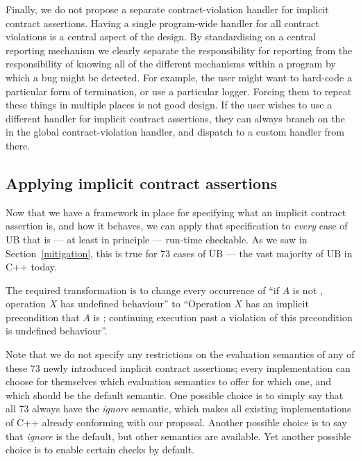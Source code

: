 Finally, we do not propose a separate contract-violation handler for implicit contract assertions. Having a single program-wide handler for all contract violations is a central aspect of the \cite{P2900R14} design. By standardising on a central reporting mechanism we clearly separate the responsibility for reporting from the responsibility of knowing all of the different mechanisms within a program by which a bug might be detected. For example, the user might want to hard-code a particular form of termination, or use a particular logger. Forcing them to repeat these things in multiple places is not good design. If the user  wishes to use a different handler for implicit contract assertions, they can always branch on the  in the global contract-violation handler, and dispatch to a custom handler from there.

\subsection{Applying implicit contract assertions}
\label{applyicas}

Now that we have a framework in place for specifying what an implicit contract assertion is, and how it behaves, we can apply that specification to \emph{every} case of UB  that is --- at least in principle --- run-time checkable. As we saw in Section~\ref{mitigation}, this is true for 73 cases of UB --- the vast majority of UB in C++ today.

The required transformation is to change every occurrence of “if $A$ is not , operation $X$ has undefined behaviour'' to ``Operation $X$ has an implicit precondition that $A$ is ; continuing execution past a violation of this precondition is undefined behaviour''.

Note that we do not specify any restrictions on the evaluation semantics of any of these 73 newly introduced  implicit contract assertions; every implementation can choose for themselves which evaluation semantics to offer for which one, and which should be the default semantic. One possible choice is to simply say that all 73 always have the \emph{ignore} semantic, which makes all existing implementations of C++ already conforming with our proposal. Another possible choice is to say that  \emph{ignore} is the default, but other semantics are available. Yet another possible choice is to enable certain checks by default.

